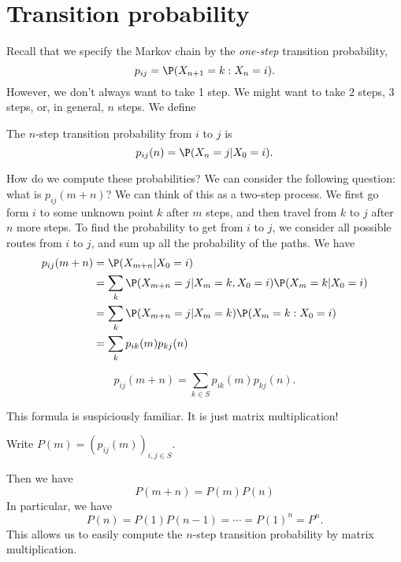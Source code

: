\documentclass[a4paper]{article}
\begin{document}
\section{Transition probability}
Recall that we specify the Markov chain by the \emph{one-step} transition probability,
\[
  p_{ij} = \P(X_{n + 1} = k: X_n = i).
\]
However, we don't always want to take 1 step. We might want to take 2 steps, 3 steps, or, in general, $n$ steps. We define
\begin{defi}
  The $n$-step transition probability from $i$ to $j$ is
  \[
    p_{ij}(n) = \P(X_n = j| X_0 = i).
  \]
\end{defi}
How do we compute these probabilities? We can consider the following question: what is $p_{ij}(m + n)$? We can think of this as a two-step process. We first go form $i$ to some unknown point $k$ after $m$ steps, and then travel from $k$ to $j$ after $n$ more steps. To find the probability to get from $i$ to $j$, we consider all possible routes from $i$ to $j$, and sum up all the probability of the paths. We have
\begin{align*}
  p_{ij}(m + n) &= \P(X_{m + n}| X_0 = i)\\
  &= \sum_k \P(X_{m + n} = j| X_m = k, X_0 = i)\P(X_m = k| X_0 = i)\\
  &= \sum_k \P(X_{m + n} = j| X_m = k)\P(X_m = k: X_0 = i)\\
  &= \sum_k p_{ik}(m)p_{kj}(n)
\end{align*}
\begin{thm}
  \[
    p_{ij}(m + n) = \sum_{k\in S} p_{ik}(m) p_{kj}(n).
  \]
\end{thm}
This formula is suspiciously familiar. It is just matrix multiplication!

\begin{notation}
  Write $P(m) = (p_{ij}(m))_{i, j\in S}$.
\end{notation}
Then we have
\[
  P(m + n) = P(m)P(n)
\]
In particular, we have
\[
  P(n) = P(1)P(n - 1) = \cdots = P(1)^n = P^n.
\]
This allows us to easily compute the $n$-step transition probability by matrix multiplication.
\end{document}
